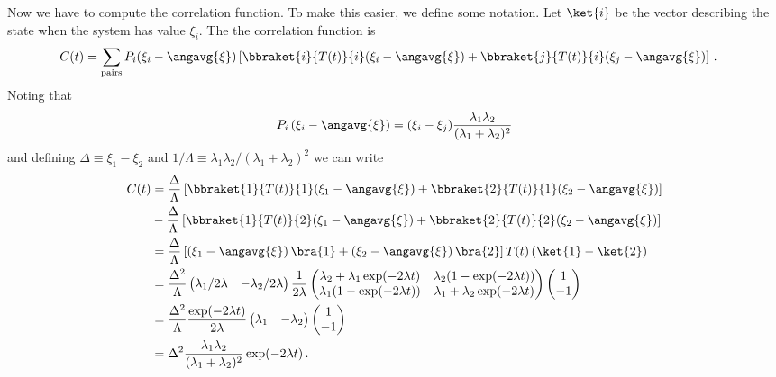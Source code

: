 Now we have to compute the correlation function.
To make this easier, we define some notation.
Let $\ket{i}$ be the vector describing the state when the system has value $\xi_i$.
The the correlation function is
\begin{align*}
  C(t)
  &= \sum_\text{pairs} P_i (\xi_i - \angavg{\xi}) \left[ \bbraket{i}{T(t)}{i}(\xi_i - \angavg{\xi}) + \bbraket{j}{T(t)}{i} (\xi_j - \angavg{\xi}) \right]
  \, .
\end{align*}
Noting that
\begin{equation*}
  P_i \left( \xi_i - \angavg{\xi} \right) = (\xi_i - \xi_j) \frac{\lambda_1 \lambda_2}{(\lambda_1 + \lambda_2)^2}
\end{equation*}
and defining $\Delta \equiv \xi_1 - \xi_2$ and $1/\Lambda \equiv \lambda_1 \lambda_2 / (\lambda_1 + \lambda_2)^2$
we can write
\begin{align*}
  C(t)
  &= \frac{\Delta}{\Lambda}
  \left[
    \bbraket{1}{T(t)}{1}(\xi_1 - \angavg{\xi}) + \bbraket{2}{T(t)}{1}(\xi_2 - \angavg{\xi})
  \right] \\
  &- \frac{\Delta}{\Lambda}
  \left[
    \bbraket{1}{T(t)}{2}(\xi_1 - \angavg{\xi}) + \bbraket{2}{T(t)}{2}(\xi_2 - \angavg{\xi})
  \right] \\
  &= \frac{\Delta}{\Lambda}
  \left[
    \left(\xi_1 - \angavg{\xi} \right) \bra{1} + \left( \xi_2 - \angavg{\xi} \right) \bra{2}
  \right]
  T(t)
  \left( \ket{1} - \ket{2} \right) \\
  &= \frac{\Delta^2}{\Lambda}
  \begin{pmatrix} \lambda_1 / 2\lambda & -\lambda_2 / 2\lambda \end{pmatrix}
  \frac{1}{2\lambda}
  \begin{pmatrix}
    \lambda_2 + \lambda_1 \exp(-2 \lambda t) & \lambda_2 ( 1 - \exp(-2 \lambda t)) \\
    \lambda_1 ( 1 - \exp(-2 \lambda t)) & \lambda_1 + \lambda_2 \exp(-2 \lambda t)
  \end{pmatrix}
  \begin{pmatrix} 1 \\ -1 \end{pmatrix} \\
  &= \frac{\Delta^2}{\Lambda}
  \frac{\exp(-2 \lambda t)}{2\lambda}
  \begin{pmatrix} \lambda_1 & -\lambda_2 \end{pmatrix}
  \begin{pmatrix} 1 \\ -1  \end{pmatrix} \\
  &= \Delta^2 \frac{\lambda_1 \lambda_2}{(\lambda_1 + \lambda_2)^2} \exp(-2 \lambda t)
  \, .
\end{align*}
